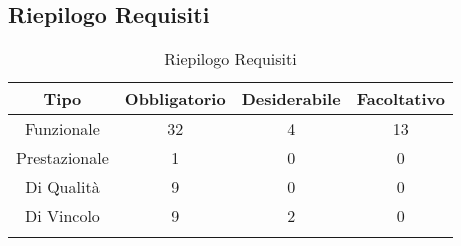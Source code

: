 \subsection{Riepilogo Requisiti}
\normalsize
\begin{longtable}{|c|c|c|c|}
	\hline 
	\textbf{Tipo} & \textbf{Obbligatorio} & \textbf{Desiderabile} & \textbf{Facoltativo}\\
	\hline
	Funzionale & 32 & 4 & 13\\ \hline
	Prestazionale & 1 & 0 & 0\\ \hline
	Di Qualità & 9 & 0 & 0\\ \hline
	Di Vincolo & 9 & 2 & 0\\ \hline
	\caption[Riepilogo Requisiti]{Riepilogo Requisiti}
	\label{tabella:riepilogorequi}
\end{longtable}
\clearpage

